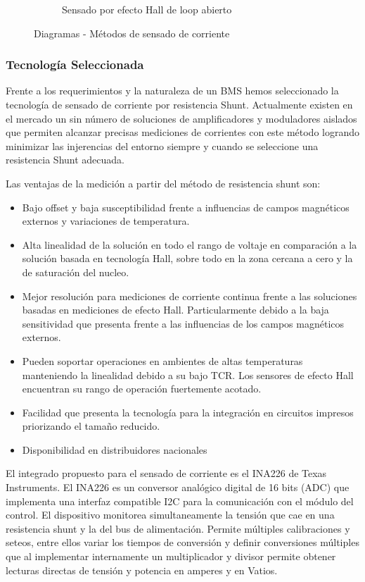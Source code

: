 \documentclass[10pt,a4paper]{article}
\begin{document}
\begin{figure}[h!]
\begin{subfigure}[b]{0.4\linewidth}
			\caption{Sensado por efecto Hall de loop abierto}
		\end{subfigure}
		\caption{Diagramas - Métodos de sensado de corriente}
		\label{fig:SenseMetods}
	\end{figure}

	\subsubsection{Tecnología Seleccionada}
	
	Frente a los requerimientos y la naturaleza de un \acrshort{BMS} hemos seleccionado la tecnología de sensado de corriente por resistencia Shunt. Actualmente existen en el mercado un sin número de soluciones de amplificadores y moduladores aislados que permiten alcanzar precisas mediciones de corrientes con este método logrando minimizar las injerencias del entorno siempre y cuando se seleccione una resistencia Shunt adecuada.
	
	\noindent Las ventajas de la medición a partir del método de resistencia 
    shunt son:
	
	\begin{itemize}
		\item Bajo offset y baja susceptibilidad frente a influencias de campos 
            magnéticos externos y variaciones de temperatura.
		\item Alta linealidad de la solución en todo el rango de voltaje en 
            comparación a la solución basada en tecnología Hall, sobre todo en 
            la zona cercana a cero y la de saturación del nucleo. 
		\item Mejor resolución para mediciones de corriente continua frente a 
            las soluciones basadas en mediciones de efecto Hall. 
            Particularmente debido a la baja sensitividad que presenta frente a 
            las influencias de los campos magnéticos externos.
		\item Pueden soportar operaciones en ambientes de altas temperaturas 
            manteniendo la linealidad debido a su bajo TCR. 
            Los sensores de efecto Hall encuentran su rango de operación 
            fuertemente acotado.
		\item Facilidad que presenta la tecnología para la integración en 
            circuitos impresos priorizando el tamaño reducido.
		\item Disponibilidad en distribuidores nacionales
	\end{itemize}
	
	\noindent El integrado propuesto para el sensado de corriente es el INA226 
    de Texas Instruments. El INA226 es un conversor analógico digital de 16 bits 
    (ADC) que implementa una interfaz compatible I2C para la comunicación con el 
    módulo del control. El dispositivo monitorea simultaneamente la tensión que 
    cae en una resistencia shunt y la del bus de alimentación. Permite múltiples 
    calibraciones y seteos, entre ellos variar los tiempos de conversión y 
    definir conversiones múltiples que al implementar internamente un 
    multiplicador y divisor permite obtener lecturas directas de tensión y 
    potencia en amperes y en Vatios.
	
\end{document}
